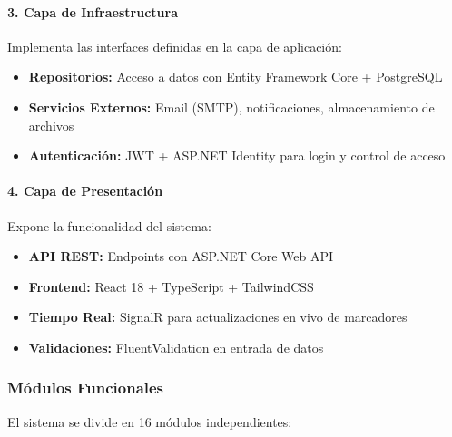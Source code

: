 \documentclass[12pt,a4paper]{article}
\begin{document}
\paragraph{3. Capa de Infraestructura}

Implementa las interfaces definidas en la capa de aplicación:

\begin{itemize}[noitemsep]
    \item \textbf{Repositorios:} Acceso a datos con Entity Framework Core + PostgreSQL
    \item \textbf{Servicios Externos:} Email (SMTP), notificaciones, almacenamiento de archivos
    \item \textbf{Autenticación:} JWT + ASP.NET Identity para login y control de acceso
\end{itemize}

\paragraph{4. Capa de Presentación}

Expone la funcionalidad del sistema:

\begin{itemize}[noitemsep]
    \item \textbf{API REST:} Endpoints con ASP.NET Core Web API
    \item \textbf{Frontend:} React 18 + TypeScript + TailwindCSS
    \item \textbf{Tiempo Real:} SignalR para actualizaciones en vivo de marcadores
    \item \textbf{Validaciones:} FluentValidation en entrada de datos
\end{itemize}

\subsubsection{Módulos Funcionales}

El sistema se divide en 16 módulos independientes:
\end{document}
